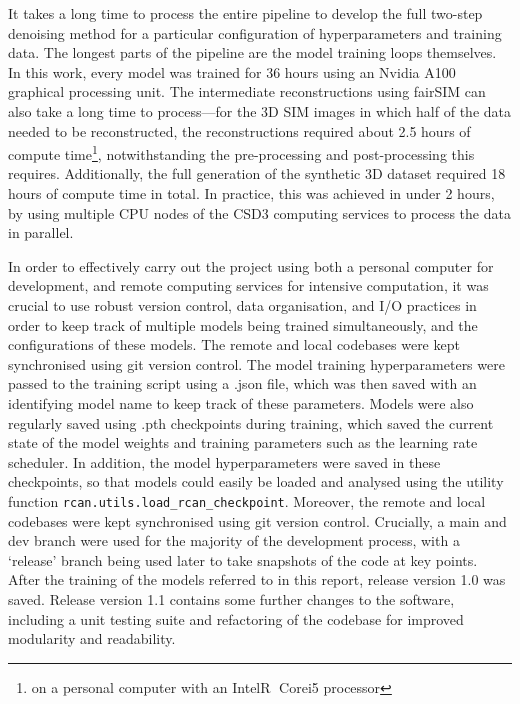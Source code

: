 \documentclass[12pt]{article}
\begin{document}
It takes a long time to process the entire pipeline to develop the full two-step denoising method for a particular configuration of hyperparameters and training data.
The longest parts of the pipeline are the model training loops themselves.
In this work, every model was trained for 36 hours using an Nvidia A100 graphical processing unit.
The intermediate reconstructions using fairSIM can also take a long time to process---for the 3D SIM images in which half of the data needed to be reconstructed,
the reconstructions required about 2.5 hours of compute time\footnote{on a personal computer with an Intel\textcircled{R} Core\texttrademark i5 processor},
notwithstanding the pre-processing and post-processing this requires.
Additionally, the full generation of the synthetic 3D dataset required 18 hours of compute time in total.
In practice, this was achieved in under 2 hours, by using multiple CPU nodes of the CSD3 computing services to process the data in parallel.

In order to effectively carry out the project using both a personal computer for development,
and remote computing services for intensive computation,
it was crucial to use robust version control, data organisation, and I/O practices in order to keep track of multiple models being trained simultaneously,
and the configurations of these models.
The remote and local codebases were kept synchronised using git version control.
The model training hyperparameters were passed to the training script using a .json file,
which was then saved with an identifying model name to keep track of these parameters.
Models were also regularly saved using .pth checkpoints during training,
which saved the current state of the model weights and training parameters such as the learning rate scheduler.
In addition, the model hyperparameters were saved in these checkpoints,
so that models could easily be loaded and analysed using the utility function \texttt{rcan.utils.load\_rcan\_checkpoint}.
Moreover, the remote and local codebases were kept synchronised using git version control.
Crucially, a main and dev branch were used for the majority of the development process,
with a `release' branch being used later to take snapshots of the code at key points.
After the training of the models referred to in this report,
release version 1.0 was saved.
Release version 1.1 contains some further changes to the software,
including a unit testing suite and refactoring of the codebase for improved modularity and readability.
\end{document}
